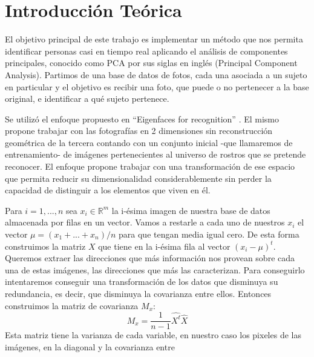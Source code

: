 \section{Introducción Teórica}
%
El objetivo principal de este trabajo es implementar un método que nos permita identificar personas casi en tiempo real aplicando el 
análisis de componentes principales, conocido como PCA por sus siglas en inglés (Principal Component Analysis).
Partimos de una base de datos de fotos, cada una asociada a un sujeto en particular y el objetivo es recibir una foto, que 
puede o no pertenecer a la base original, e identificar a qué sujeto pertenece.
\par
Se utilizó el enfoque propuesto en ``Eigenfaces for recognition'' \cite{eigenfaces}. El mismo propone trabajar
con las fotografías en 2 dimensiones sin reconstrucción geométrica de la tercera contando con un conjunto inicial -que 
llamaremos de entrenamiento- de imágenes pertenecientes al universo de rostros que se pretende reconocer. El enfoque propone trabajar 
con una transformación de ese espacio que permita reducir su dimensionalidad considerablemente sin perder la capacidad de distinguir 
a los elementos que viven en él.
\par
Para $i = 1,...,n$ sea $x_i\in\mathbb{R}^m$ la i-ésima imagen de nuestra base de datos almacenada por filas en un vector. Vamos a restarle 
a cada uno de nuestros $x_i$ el vector $\mu = (x_1+...+x_n)/n$ para que tengan media igual cero. De esta forma construimos la matriz $X$ que
tiene en la i-ésima fila al vector $(x_i-\mu)^t$. Queremos extraer las direcciones que más información nos provean sobre cada una de estas 
imágenes, las direcciones que más las caracterizan. Para conseguirlo intentaremos conseguir una transformación de los datos que disminuya su 
redundancia, es decir, que disminuya la covarianza entre ellos. Entonces construimos la matriz de covarianza $M_x$:
\begin{displaymath}
 M_x = \frac{1}{n-1}\hat{X^t}\hat{X}
\end{displaymath}
Esta matriz tiene la varianza de cada variable, en nuestro caso los pixeles de las imágenes, en la diagonal y la covarianza entre 
